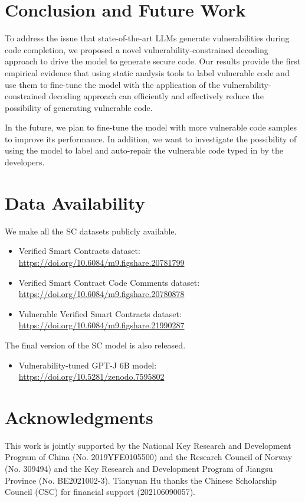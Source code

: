 \documentclass[12pt]{book}
\begin{document}
\section{Conclusion and Future Work}
\label{chap:conclusion}

To address the issue that state-of-the-art LLMs generate vulnerabilities during code completion, we proposed a novel vulnerability-constrained decoding approach to drive the model to generate secure code. Our results provide the first empirical evidence that using static analysis tools to label vulnerable code and use them to fine-tune the model with the application of the vulnerability-constrained decoding approach can efficiently and effectively reduce the possibility of generating vulnerable code.

In the future, we plan to fine-tune the model with more vulnerable code samples to improve its performance. In addition, we want to investigate the possibility of using the model to label and auto-repair the vulnerable code typed in by the developers. 



\section{Data Availability}
\label{chap:data-availability}

We make all the SC datasets publicly available.
\begin{itemize}
    \item Verified Smart Contracts dataset:\\ \url{https://doi.org/10.6084/m9.figshare.20781799}
    \item Verified Smart Contract Code Comments dataset:\\ \url{https://doi.org/10.6084/m9.figshare.20780878}
    \item Vulnerable Verified Smart Contracts dataset:\\ \url{https://doi.org/10.6084/m9.figshare.21990287}
\end{itemize}

The final version of the SC model is also released.
\begin{itemize}
    \item Vulnerability-tuned GPT-J 6B model:\\ \url{https://doi.org/10.5281/zenodo.7595802}
\end{itemize}


\section*{Acknowledgments}
This work is jointly supported by the National Key Research and Development Program of China (No. 2019YFE0105500) and the Research Council of Norway (No. 309494) and the Key Research and Development Program of Jiangsu
Province (No. BE2021002-3). Tianyuan Hu thanks the Chinese Scholarship Council (CSC) for financial support (202106090057).
\end{document}
